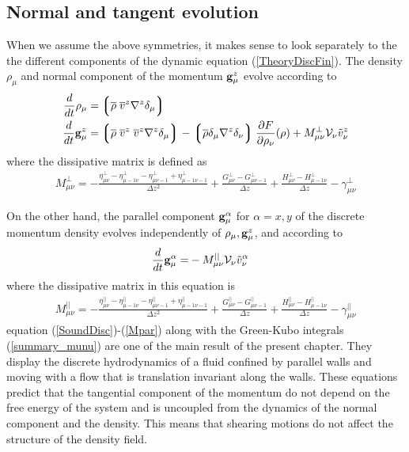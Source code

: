 \documentclass[b5paper,openright,10pt]{book}
\newcommand{\llg}{\left\lgroup}
\newcommand{\rlg}{\right\rgroup}
\begin{document}
\subsection{Normal and tangent evolution}
When we assume the above symmetries, it makes sense to look separately to the 
the different components of the dynamic equation (\ref{TheoryDiscFin}).
The density $\rho_\mu$ and normal  component of the momentum ${\bf g}^{z}_\mu$
evolve according to
\begin{align}
\frac{d}{dt}\rho_\mu=&  \llg\overline{\rho} \; \overline{v}^{z}{\nabla}^{z}\delta_\mu \rlg
\nonumber\\
    \frac{d}{dt}{{\bf g}}^{z}_\mu=&
\llg\overline{\rho}\; \overline{v}^{z}\;\overline{v}^{z}{\nabla}^{z}\delta_{\mu}\rlg
-\llg\overline{\rho}\delta_{\mu}{\nabla}^{z}\delta_{\nu}\rlg
\frac{\partial  F}{\partial \rho_{\nu}}(\rho)
+M_{\mu\nu}^{\bot}{\cal V}_\nu\tilde{v}^{z}_\nu
\label{SoundDisc}
\end{align}
where the dissipative matrix is defined as
\begin{align}
M^{\bot}_{\mu\nu} 
=-\frac{\eta^\bot_{\mu\nu}-\eta^\bot_{\mu-1\nu}-\eta^\bot_{\mu\nu-1}+\eta^\bot_{\mu-1\nu-1}}{\Delta z^2}
+\frac{{G}^\bot_{\mu\nu}-{G}^\bot_{\mu\nu-1}}{\Delta z}
+\frac{{H}^\bot_{\mu\nu}-{H}^\bot_{\mu-1\nu}}{\Delta z}
-{\gamma}^\bot_{\mu\nu}
\label{Mbot}
\end{align}

On the other  hand, the parallel component  ${\bf g}^\alpha_\mu$ for $\alpha
=x,y$  of  the  discrete  momentum density  evolves  independently  of
$\rho_\mu,{\bf g}^{z}_\mu$, and according to
\begin{align}
    \frac{d}{dt}{{\bf g}}^\alpha_\mu=&-M_{\mu\nu}^{||}{\cal V}_\nu\tilde{v}^\alpha_\nu
\label{ShearDisc}
\end{align}
where the dissipative matrix in this equation is
\begin{align}
M^{||}_{\mu\nu} 
=-\frac{\eta^{||}_{\mu\nu}-\eta^{||}_{\mu-1\nu}-\eta^{||}_{\mu\nu-1}+\eta^{||}_{\mu-1\nu-1}}{\Delta z^2}
+\frac{{G}^{||}_{\mu\nu}-{G}^{||}_{\mu\nu-1}}{\Delta z}
+\frac{{H}^{||}_{\mu\nu}-{H}^{||}_{\mu-1\nu}}{\Delta z}
-{\gamma}^{||}_{\mu\nu}
\label{Mpar}
\end{align}
equation (\ref{SoundDisc})-(\ref{Mpar}) along with the Green-Kubo integrals
(\ref{summary_munu})  are  one  of  the main  result  of  the  present
chapter. They display the discrete  hydrodynamics of a fluid confined by
parallel walls  and moving with  a flow that is  translation invariant
along the walls. These equations predict that the tangential component
of the momentum do not depend on  the free energy of the system and is
uncoupled  from  the   dynamics  of  the  normal   component  and  the
density.  This  means that  shearing
motions do not affect the structure of the density field.
\end{document}
